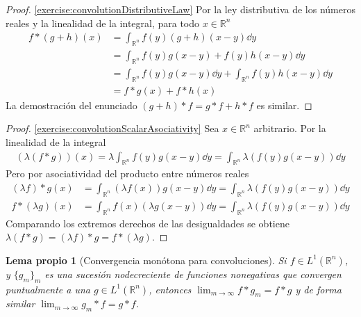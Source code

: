 \documentclass{article}
\newcommand{\realNumbers}{\mathbb{R}}
\newcommand{\integrableFunctions}{L^1(\realNumbers^n)}
\newtheorem{myLemma}{Lema propio}
\theoremstyle{remark}
\begin{document}
  \begin{proof}
    \ref{exercise:convolutionDistributiveLaw}
    Por la ley distributiva de los números reales y la linealidad de la integral, para todo \(x \in \realNumbers^n\)
    \begin{align}
      f * (g + h) (x)
      &=
      \int_{\realNumbers^n} f(y) (g + h) (x - y) \dd y
      \\
      &=
      \int_{\realNumbers^n} f(y) g(x - y) + f(y) h(x - y)  \dd y
      \\
      &=
      \int_{\realNumbers^n} f(y) g(x - y) \dd y + \int_{\realNumbers^n} f(y) h(x - y)  \dd y
      \\
      &=
      f * g (x) + f * h (x)
    \end{align}
    La demostración del enunciado \((g + h) * f = g * f + h * f\) es similar.
  \end{proof} 

  \begin{proof}
    \ref{exercise:convolutionScalarAsociativity}
    Sea \(x \in \realNumbers^n\) arbitrario.
    Por la linealidad de la integral
    \begin{align}
      (\lambda (f * g)) (x)
      =
      \lambda \int_{\realNumbers^n} f(y) g(x - y) \dd y
      =
      \int_{\realNumbers^n} \lambda (f(y) g(x - y)) \dd y
    \end{align}
    Pero por asociatividad del producto entre números reales
    \begin{align}
      (\lambda f) * g (x)
      &=
      \int_{\realNumbers^n} (\lambda f(x)) g(x - y) \dd y
      =
      \int_{\realNumbers^n} \lambda (f(y) g(x - y)) \dd y
      \\
      f * (\lambda g) (x)
      &=
      \int_{\realNumbers^n} f(x) (\lambda g(x - y)) \dd y
      =
      \int_{\realNumbers^n} \lambda (f(y) g(x - y)) \dd y      
    \end{align}
    Comparando los extremos derechos de las desigualdades se obtiene \(\lambda (f * g) = (\lambda f) * g = f * (\lambda g)\).
  \end{proof}

  \begin{myLemma}[Convergencia monótona para convoluciones]
    \label{myLemma:convolutionMonotoneConvergence}
    Si \(f \in \integrableFunctions\), y \(\{g_m\}_m\) es una sucesión nodecreciente de funciones nonegativas que convergen puntualmente a una \(g \in \integrableFunctions\), entonces \(\lim_{m \rightarrow \infty} f * g_m =f * g\) y de forma similar \(\lim_{m \rightarrow \infty} g_m * f = g * f\).
  \end{myLemma}
\end{document}
